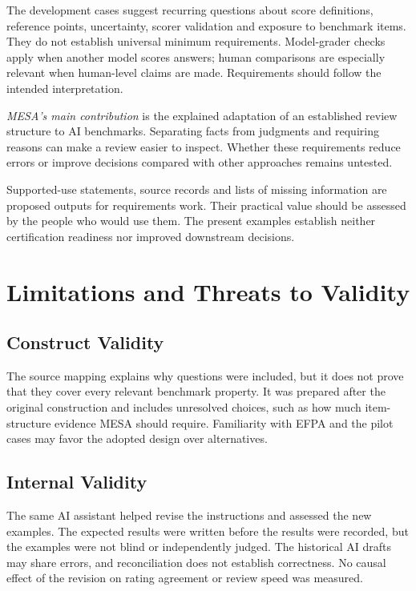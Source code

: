 \documentclass[conference]{IEEEtran}
\begin{document}
    The development cases suggest recurring questions about score definitions, reference points, uncertainty, scorer validation and exposure to benchmark items. They do not establish universal minimum requirements. Model-grader checks apply when another model scores answers; human comparisons are especially relevant when human-level claims are made. Requirements should follow the intended interpretation.
    
    \emph{MESA's main contribution} is the explained adaptation of an established review structure to AI benchmarks. Separating facts from judgments and requiring reasons can make a review easier to inspect. Whether these requirements reduce errors or improve decisions compared with other approaches remains untested.
    
    Supported-use statements, source records and lists of missing information are proposed outputs for requirements work. Their practical value should be assessed by the people who would use them. The present examples establish neither certification readiness nor improved downstream decisions.

\section{Limitations and Threats to Validity}
\label{sec:threats}
\label{sec:limitations}

    \subsection{Construct Validity}

        The source mapping explains why questions were included, but it does not prove that they cover every relevant benchmark property. It was prepared after the original construction and includes unresolved choices, such as how much item-structure evidence MESA should require. Familiarity with EFPA and the pilot cases may favor the adopted design over alternatives.

    \subsection{Internal Validity}

        The same AI assistant helped revise the instructions and assessed the new examples. The expected results were written before the results were recorded, but the examples were not blind or independently judged. The historical AI drafts may share errors, and reconciliation does not establish correctness. No causal effect of the revision on rating agreement or review speed was measured.
    
\end{document}
